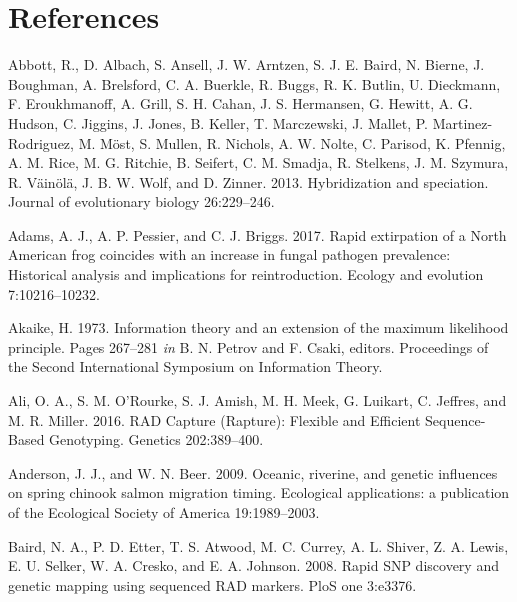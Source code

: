 \documentclass[proquest,12pt,final]{ucthesis-CA2012} %
\begin{document}
\begin{ucmainmatter}
\backmatter

\hypertarget{references}{%
\chapter*{References}\label{references}}


\noindent

\setlength{\parindent}{-0.20in}
\setlength{\leftskip}{0.20in}
\setlength{\parskip}{8pt}

\hypertarget{refs}{}
\leavevmode\hypertarget{ref-abbott_hybridization_2013}{}%
Abbott, R., D. Albach, S. Ansell, J. W. Arntzen, S. J. E. Baird, N.
Bierne, J. Boughman, A. Brelsford, C. A. Buerkle, R. Buggs, R. K.
Butlin, U. Dieckmann, F. Eroukhmanoff, A. Grill, S. H. Cahan, J. S.
Hermansen, G. Hewitt, A. G. Hudson, C. Jiggins, J. Jones, B. Keller, T.
Marczewski, J. Mallet, P. Martinez-Rodriguez, M. Möst, S. Mullen, R.
Nichols, A. W. Nolte, C. Parisod, K. Pfennig, A. M. Rice, M. G. Ritchie,
B. Seifert, C. M. Smadja, R. Stelkens, J. M. Szymura, R. Väinölä, J. B.
W. Wolf, and D. Zinner. 2013. Hybridization and speciation. Journal of
evolutionary biology 26:229--246.

\leavevmode\hypertarget{ref-adams_rapid_2017}{}%
Adams, A. J., A. P. Pessier, and C. J. Briggs. 2017. Rapid extirpation
of a North American frog coincides with an increase in fungal pathogen
prevalence: Historical analysis and implications for reintroduction.
Ecology and evolution 7:10216--10232.

\leavevmode\hypertarget{ref-akaike_information_1973}{}%
Akaike, H. 1973. Information theory and an extension of the maximum
likelihood principle. Pages 267--281 \emph{in} B. N. Petrov and F.
Csaki, editors. Proceedings of the Second International Symposium on
Information Theory.

\leavevmode\hypertarget{ref-ali_rad_2016}{}%
Ali, O. A., S. M. O'Rourke, S. J. Amish, M. H. Meek, G. Luikart, C.
Jeffres, and M. R. Miller. 2016. RAD Capture (Rapture): Flexible and
Efficient Sequence-Based Genotyping. Genetics 202:389--400.

\leavevmode\hypertarget{ref-anderson_oceanic_2009}{}%
Anderson, J. J., and W. N. Beer. 2009. Oceanic, riverine, and genetic
influences on spring chinook salmon migration timing. Ecological
applications: a publication of the Ecological Society of America
19:1989--2003.

\leavevmode\hypertarget{ref-baird_rapid_2008}{}%
Baird, N. A., P. D. Etter, T. S. Atwood, M. C. Currey, A. L. Shiver, Z.
A. Lewis, E. U. Selker, W. A. Cresko, and E. A. Johnson. 2008. Rapid SNP
discovery and genetic mapping using sequenced RAD markers. PloS one
3:e3376.


\end{ucmainmatter}
\end{document}
